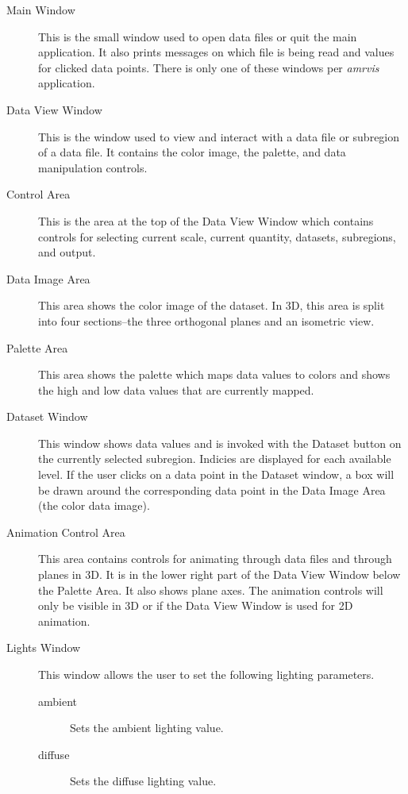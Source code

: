 \begin{description}
\item[Main Window]  This is the small window used to open data files
or quit the main application.  It also prints messages on which file
is being read and values for clicked data points.  There is only one
of these windows per {\em amrvis} application.

\item[Data View Window]  This is the window used to view and interact
with a data file or subregion of a data file.  It contains the color image,
the palette, and data manipulation controls.

\item[Control Area]  This is the area at the top of the Data View Window
which contains controls for selecting current scale, current quantity,
datasets, subregions, and output.

\item[Data Image Area]  This area shows the color image of the dataset.
In 3D, this area is split into four sections--the three orthogonal
planes and an isometric view.

\item[Palette Area]  This area shows the palette which maps data values
to colors and shows the high and low data values that are currently mapped.

\item[Dataset Window]  This window shows data values and is invoked
with the Dataset button on the currently selected subregion.
Indicies are displayed for each available level.  If the user
clicks on a data point in the Dataset window, a box will be
drawn around the corresponding data point in the Data Image Area
(the color data image).

\item[Animation Control Area]  This area contains controls for animating
through data files and through planes in 3D.  It is in the lower right
part of the Data View Window below the Palette Area.  It also shows
plane axes.  The animation controls will only be visible in 3D or
if the Data View Window is used for 2D animation.

\item[Lights Window] This window allows the user to set the following
lighting parameters.

\begin{description}
\item [ambient]  Sets the ambient lighting value.

\item [diffuse]  Sets the diffuse lighting value.


\end{description}
\end{description}
